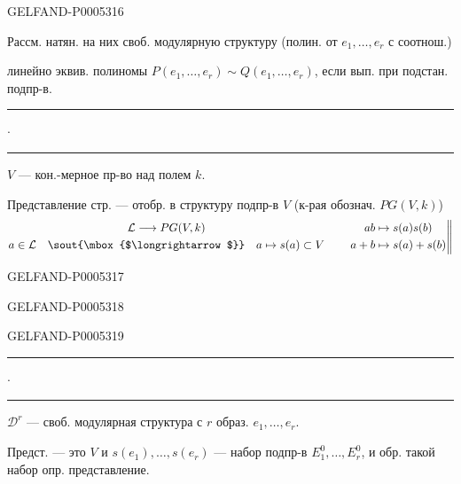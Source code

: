 \begin{GelfandAdjacentEvidence}{GELFAND-P000531}{6}

Рассм. натян. на них своб. модулярную структуру (полин. от $e_1,\ldots,e_r$ с соотнош.)

линейно эквив. полиномы $P(e_1,\ldots,e_r)\sim Q(e_1,\ldots,e_r)$, если вып. при подстан. подпр-в.

\hfill\rule{.9cm}{.35pt}\enspace\(\cdot\)\enspace\rule{1.25cm}{.35pt}\par

$V$ — кон.-мерное пр-во над полем $k$.

Представление стр. — отобр. в структуру подпр-в $V$ (к-рая обознач. $PG(V,k)$)
\[
\begin{gathered}
\mathcal L\longrightarrow PG(V,k)\\
a\in\mathcal L\quad\text{\sout{\mbox{$\longrightarrow$}}}\quad a\mapsto s(a)\subset V
\end{gathered}
\qquad
\left.\begin{aligned}
ab&\mapsto s(a)s(b)\\
a+b&\mapsto s(a)+s(b)
\end{aligned}\right\Vert
\]
\end{GelfandAdjacentEvidence}
\begin{GelfandAdjacentEvidence}{GELFAND-P000531}{7}

\end{GelfandAdjacentEvidence}
\begin{GelfandAdjacentEvidence}{GELFAND-P000531}{8}

\end{GelfandAdjacentEvidence}
\begin{GelfandAdjacentEvidence}{GELFAND-P000531}{9}


\hfill\rule{.9cm}{.35pt}\enspace\(\cdot\)\enspace\rule{1.25cm}{.35pt}\par

$\mathcal D^r$ — своб. модулярная структура с $r$ образ. $e_1,\ldots,e_r$.

Предст. — это $V$ и $s(e_1),\ldots,s(e_r)$ — набор подпр-в $E_1^0,\ldots,E_r^0$,
и обр. такой набор опр. представление.
\end{GelfandAdjacentEvidence}

